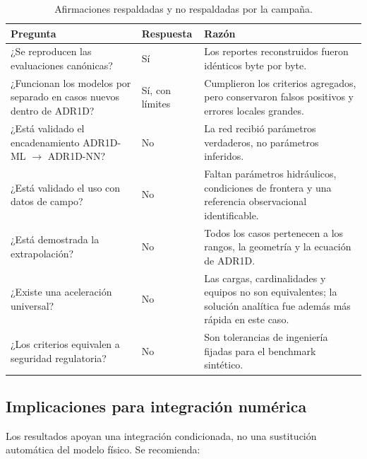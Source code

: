 \documentclass[11pt,a4paper]{article}
\begin{document}
\begin{table}[H]
\centering
\caption{Afirmaciones respaldadas y no respaldadas por la campaña.}
\label{tab:claim-boundaries}
\small
\begin{tabularx}{\textwidth}{@{}Yp{2.3cm}Y@{}}
\toprule
Pregunta & Respuesta & Razón \\
\midrule
¿Se reproducen las evaluaciones canónicas? & Sí & Los reportes reconstruidos
fueron idénticos byte por byte. \\
¿Funcionan los modelos por separado en casos nuevos dentro de ADR1D? & Sí, con
límites & Cumplieron los criterios agregados, pero conservaron falsos positivos
y errores locales grandes. \\
¿Está validado el encadenamiento ADR1D-ML $\rightarrow$ ADR1D-NN? & No & La red
recibió parámetros verdaderos, no parámetros inferidos. \\
¿Está validado el uso con datos de campo? & No & Faltan parámetros hidráulicos,
condiciones de frontera y una referencia observacional identificable. \\
¿Está demostrada la extrapolación? & No & Todos los casos pertenecen a los
rangos, la geometría y la ecuación de ADR1D. \\
¿Existe una aceleración universal? & No & Las cargas, cardinalidades y equipos
no son equivalentes; la solución analítica fue además más rápida en este caso. \\
¿Los criterios equivalen a seguridad regulatoria? & No & Son tolerancias de
ingeniería fijadas para el benchmark sintético. \\
\bottomrule
\end{tabularx}
\end{table}

\subsection{Implicaciones para integración numérica}

Los resultados apoyan una integración condicionada, no una sustitución
automática del modelo físico. Se recomienda:
\end{document}
